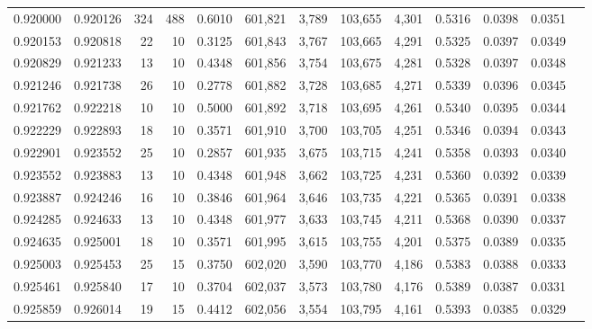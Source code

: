\begin{tabular}{rrrrrrrrrrrrr}
0.920000 & 0.920126 &   324 & 488 &                                     0.6010 & 601,821 &   3,789 & 103,655 &   4,301 & 0.5316 & 0.0398 & 0.0351 \\
0.920153 & 0.920818 &    22 &  10 &                                     0.3125 & 601,843 &   3,767 & 103,665 &   4,291 & 0.5325 & 0.0397 & 0.0349 \\
0.920829 & 0.921233 &    13 &  10 &                                     0.4348 & 601,856 &   3,754 & 103,675 &   4,281 & 0.5328 & 0.0397 & 0.0348 \\
0.921246 & 0.921738 &    26 &  10 &                                     0.2778 & 601,882 &   3,728 & 103,685 &   4,271 & 0.5339 & 0.0396 & 0.0345 \\
0.921762 & 0.922218 &    10 &  10 &                                     0.5000 & 601,892 &   3,718 & 103,695 &   4,261 & 0.5340 & 0.0395 & 0.0344 \\
0.922229 & 0.922893 &    18 &  10 &                                     0.3571 & 601,910 &   3,700 & 103,705 &   4,251 & 0.5346 & 0.0394 & 0.0343 \\
0.922901 & 0.923552 &    25 &  10 &                                     0.2857 & 601,935 &   3,675 & 103,715 &   4,241 & 0.5358 & 0.0393 & 0.0340 \\
0.923552 & 0.923883 &    13 &  10 &                                     0.4348 & 601,948 &   3,662 & 103,725 &   4,231 & 0.5360 & 0.0392 & 0.0339 \\
0.923887 & 0.924246 &    16 &  10 &                                     0.3846 & 601,964 &   3,646 & 103,735 &   4,221 & 0.5365 & 0.0391 & 0.0338 \\
0.924285 & 0.924633 &    13 &  10 &                                     0.4348 & 601,977 &   3,633 & 103,745 &   4,211 & 0.5368 & 0.0390 & 0.0337 \\
0.924635 & 0.925001 &    18 &  10 &                                     0.3571 & 601,995 &   3,615 & 103,755 &   4,201 & 0.5375 & 0.0389 & 0.0335 \\
0.925003 & 0.925453 &    25 &  15 &                                     0.3750 & 602,020 &   3,590 & 103,770 &   4,186 & 0.5383 & 0.0388 & 0.0333 \\
0.925461 & 0.925840 &    17 &  10 &                                     0.3704 & 602,037 &   3,573 & 103,780 &   4,176 & 0.5389 & 0.0387 & 0.0331 \\
0.925859 & 0.926014 &    19 &  15 &                                     0.4412 & 602,056 &   3,554 & 103,795 &   4,161 & 0.5393 & 0.0385 & 0.0329 \\

\end{tabular}
